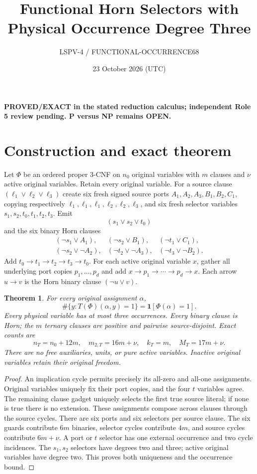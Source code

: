 \documentclass[11pt]{article}
\title{Functional Horn Selectors with Physical Occurrence Degree Three}
\author{LSPV-4 / FUNCTIONAL-OCCURRENCE68}
\date{23 October 2026 (UTC)}
\newtheorem{theorem}{Theorem}
\begin{document}
\maketitle
\noindent\textbf{PROVED/EXACT in the stated reduction calculus; independent Role 5 review pending. P versus NP remains OPEN.}

\section{Construction and exact theorem}
Let $\Phi$ be an ordered proper 3-CNF on $n_0$ original variables with $m$ clauses and $\nu$ active original variables. Retain every original variable. For a source clause $(\ell_1\vee\ell_2\vee\ell_3)$ create six fresh signed source ports $A_1,A_2,A_3,B_1,B_2,C_1$, copying respectively $\ell_1,\ell_1,\ell_1,\ell_2,\ell_2,\ell_3$, and six fresh selector variables $s_1,s_2,t_0,t_1,t_2,t_3$. Emit
\[
(s_1\vee s_2\vee t_0)
\]
and the six binary Horn clauses
\[
\begin{array}{lll}
(\neg s_1\vee A_1),&(\neg s_2\vee B_1),&(\neg t_1\vee C_1),\\
(\neg s_2\vee\neg A_2),&(\neg t_2\vee\neg A_3),&(\neg t_3\vee\neg B_2).
\end{array}
\]
Add $t_0\to t_1\to t_2\to t_3\to t_0$. For each active original variable $x$, gather all underlying port copies $p_1,\ldots,p_d$ and add $x\to p_1\to\cdots\to p_d\to x$. Each arrow $u\to v$ is the Horn binary clause $(\neg u\vee v)$.

\begin{theorem}
For every original assignment $\alpha$,
\[
\#\{y:T(\Phi)(\alpha,y)=1\}=\mathbf1[\Phi(\alpha)=1].
\]
Every physical variable has at most three occurrences. Every binary clause is Horn; the $m$ ternary clauses are positive and pairwise source-disjoint. Exact counts are
\[
n_T=n_0+12m,\quad m_{2,T}=16m+\nu,\quad k_T=m,\quad M_T=17m+\nu.
\]
There are no free auxiliaries, units, or pure active variables. Inactive original variables retain their original freedom.
\end{theorem}
\begin{proof}
An implication cycle permits precisely its all-zero and all-one assignments. Original variables uniquely fix their port copies, and the four $t$ variables agree. The remaining clause gadget uniquely selects the first true source literal; if none is true there is no extension. These assignments compose across clauses through the source cycles. There are six ports and six selectors per source clause. The six guards contribute $6m$ binaries, selector cycles contribute $4m$, and source cycles contribute $6m+\nu$. A port or $t$ selector has one external occurrence and two cycle incidences. The $s_1,s_2$ selectors have degrees two and three; active original variables have degree two. This proves both uniqueness and the occurrence bound.
\end{proof}
\end{document}
